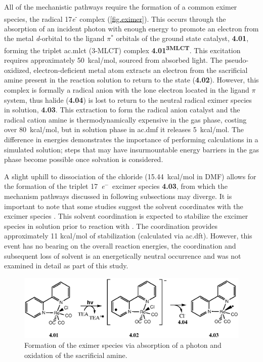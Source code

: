 All of the mechanistic pathways require the formation of a common eximer species, the radical 17\textit{e}\textsuperscript{-} complex (\autoref{fig.eximer}). This occurs through the absorption of an incident photon with enough energy to promote an electron from the metal \textit{d}-orbital to the ligand $\pi^\ast$ orbitals of the ground state catalyst, \textbf{4.01}, forming the triplet \acrlong{ac.mlct} (3-MLCT) complex \textbf{4.01\textsuperscript{3MLCT}}. This excitation requires approximately 50~kcal/mol, sourced from absorbed light. The pseudo-oxidized, electron-deficient metal atom extracts an electron from the sacrificial amine present in the reaction solution to return to the  state (\textbf{4.02}). However, this complex is formally a radical anion with the lone electron located in the ligand $\pi$ system, thus halide (\textbf{4.04}) is lost to return to the neutral radical eximer species in solution, \textbf{4.03}. This extraction to form the radical anion catalyst and the radical cation amine is thermodynamically expensive in the gas phase, costing over 80~kcal/mol, but in solution phase in \gls{ac.dmf} it releases 5~kcal/mol. The difference in energies demonstrates the importance of performing calculations in a simulated solution; steps that may have insurmountable energy barriers in the gas phase become possible once solvation is considered.

A slight uphill to dissociation of the chloride (15.44~kcal/mol in DMF) allows for the formation of the triplet 17~\textit{e}$^-$~excimer species \textbf{4.03}, from which the  mechanism pathways discussed in following subsections may diverge. It is important to note that some studies suggest the solvent coordinates with the excimer species \autocite{morris2009, kou2014}. This solvent coordination is expected to stabilize the excimer species in solution prior to reaction with \autocite{fujita2004}. The coordination provides approximately 11 kcal/mol of stabilization (calculated via \gls{ac.dft}). However, this event has no bearing on the overall reaction energies, the coordination and subsequent loss of solvent is an energetically neutral occurrence and was not examined in detail as part of this study.

\begin{figure}[!htb]
 \begin{center}
  \includegraphics[clip=true, width=120mm, keepaspectratio]{images/eximer.eps}
 \end{center}
\caption{Formation of the eximer species via absorption of a photon and oxidation of the sacrificial amine.}
\label{fig.eximer}
\end{figure} 

